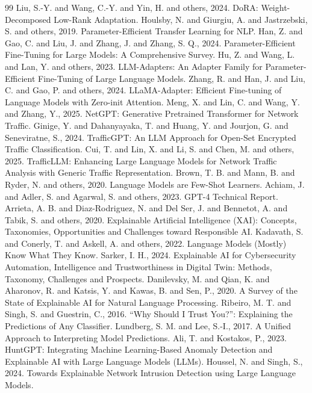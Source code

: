 \documentclass[12pt,a4paper]{article}
\begin{document}
\begin{thebibliography}{99}
 Liu, S.-Y. and Wang, C.-Y. and Yin, H. and others, 2024. DoRA: Weight-Decomposed Low-Rank Adaptation.
 Houlsby, N. and Giurgiu, A. and Jastrzebski, S. and others, 2019. Parameter-Efficient Transfer Learning for NLP.
 Han, Z. and Gao, C. and Liu, J. and Zhang, J. and Zhang, S. Q., 2024. Parameter-Efficient Fine-Tuning for Large Models: A Comprehensive Survey.
 Hu, Z. and Wang, L. and Lan, Y. and others, 2023. LLM-Adapters: An Adapter Family for Parameter-Efficient Fine-Tuning of Large Language Models.
 Zhang, R. and Han, J. and Liu, C. and Gao, P. and others, 2024. LLaMA-Adapter: Efficient Fine-tuning of Language Models with Zero-init Attention.
 Meng, X. and Lin, C. and Wang, Y. and Zhang, Y., 2025. NetGPT: Generative Pretrained Transformer for Network Traffic.
 Ginige, Y. and Dahanyayaka, T. and Huang, Y. and Jourjon, G. and Seneviratne, S., 2024. TrafficGPT: An LLM Approach for Open-Set Encrypted Traffic Classification.
 Cui, T. and Lin, X. and Li, S. and Chen, M. and others, 2025. TrafficLLM: Enhancing Large Language Models for Network Traffic Analysis with Generic Traffic Representation.
 Brown, T. B. and Mann, B. and Ryder, N. and others, 2020. Language Models are Few-Shot Learners.
 Achiam, J. and Adler, S. and Agarwal, S. and others, 2023. GPT-4 Technical Report.
 Arrieta, A. B. and Diaz-Rodriguez, N. and Del Ser, J. and Bennetot, A. and Tabik, S. and others, 2020. Explainable Artificial Intelligence (XAI): Concepts, Taxonomies, Opportunities and Challenges toward Responsible AI.
 Kadavath, S. and Conerly, T. and Askell, A. and others, 2022. Language Models (Mostly) Know What They Know.
 Sarker, I. H., 2024. Explainable AI for Cybersecurity Automation, Intelligence and Trustworthiness in Digital Twin: Methods, Taxonomy, Challenges and Prospects.
 Danilevsky, M. and Qian, K. and Aharonov, R. and Katsis, Y. and Kawas, B. and Sen, P., 2020. A Survey of the State of Explainable AI for Natural Language Processing.
 Ribeiro, M. T. and Singh, S. and Guestrin, C., 2016. ``Why Should I Trust You?'': Explaining the Predictions of Any Classifier.
 Lundberg, S. M. and Lee, S.-I., 2017. A Unified Approach to Interpreting Model Predictions.
 Ali, T. and Kostakos, P., 2023. HuntGPT: Integrating Machine Learning-Based Anomaly Detection and Explainable AI with Large Language Models (LLMs).
 Houssel, N. and Singh, S., 2024. Towards Explainable Network Intrusion Detection using Large Language Models.

\end{thebibliography}
\end{document}
